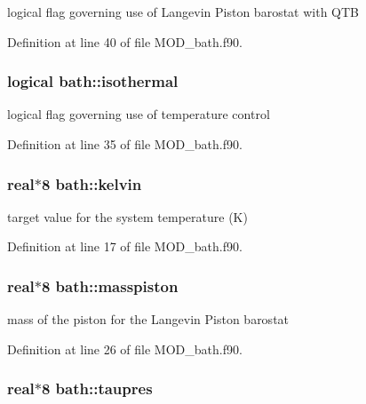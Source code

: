 logical flag governing use of Langevin Piston barostat with Q\-T\-B 



Definition at line 40 of file M\-O\-D\-\_\-bath.\-f90.

\hypertarget{classbath_a319ca259bea972503f4a8c2ecf7b46e1}{
\subsubsection[{isothermal}]{\setlength{\rightskip}{0pt plus 5cm}logical bath\-::isothermal}}\label{classbath_a319ca259bea972503f4a8c2ecf7b46e1}


logical flag governing use of temperature control 



Definition at line 35 of file M\-O\-D\-\_\-bath.\-f90.

\hypertarget{classbath_ac7ba8921357427e956ddb761956aeee6}{
\subsubsection[{kelvin}]{\setlength{\rightskip}{0pt plus 5cm}real$\ast$8 bath\-::kelvin}}\label{classbath_ac7ba8921357427e956ddb761956aeee6}


target value for the system temperature (K) 



Definition at line 17 of file M\-O\-D\-\_\-bath.\-f90.

\hypertarget{classbath_aa9f430eecd1545822ec94aab78e0536b}{
\subsubsection[{masspiston}]{\setlength{\rightskip}{0pt plus 5cm}real$\ast$8 bath\-::masspiston}}\label{classbath_aa9f430eecd1545822ec94aab78e0536b}


mass of the piston for the Langevin Piston barostat 



Definition at line 26 of file M\-O\-D\-\_\-bath.\-f90.

\hypertarget{classbath_a4d9c5934953a1047212e5280cf4135d3}{
\subsubsection[{taupres}]{\setlength{\rightskip}{0pt plus 5cm}real$\ast$8 bath\-::taupres}}\label{classbath_a4d9c5934953a1047212e5280cf4135d3}


